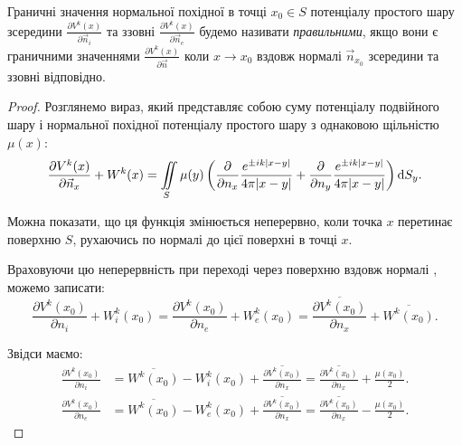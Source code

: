 \begin{definition}
	Граничні значення нормальної похідної в точці $x_0 \in S$ потенціалу простого шару зсередини $\frac{\partial V^k(x)}{\partial \vec n_{i}}$ та ззовні $\frac{\partial V^k(x)}{\partial \vec n_{e}}$ будемо називати \textit{правильними}, якщо вони є граничними значеннями $\frac{\partial V^k(x)}{\partial \vec n}$ коли $x \to x_0$ вздовж нормалі $\vec n_{x_0}$ зсередини та ззовні відповідно.
\end{definition}

\begin{proof}
	Розглянемо вираз, який представляє собою суму потенціалу подвійного шару і нормальної похідної потенціалу простого шару з  однаковою щільністю $\mu(x)$:
	\begin{equation}
		\frac{\partial V^k(x)}{\partial \vec n_x} + W^k(x) = \displaystyle\iint\limits_S \mu(y) \left( \frac{\partial}{\partial n_x} \frac{e^{\pm i k |x - y|}}{4 \pi |x - y|} + \frac{\partial}{\partial n_y} \frac{e^{\pm i k |x - y|}}{4 \pi |x - y|} \right) \mathop{}\!\mathrm{d} S_y.
	\end{equation}

	Можна показати, що ця функція змінюється неперервно, коли точка $x$ перетинає поверхню $S$, рухаючись по нормалі до цієї поверхні в точці $x$. \medskip

	Враховуючи цю неперервність при переході через поверхню вздовж нормалі , можемо записати:
	\begin{equation}
		\frac{\partial V^k(x_0)}{\partial n_{i}} + W_{i}^k(x_0) = \frac{\partial V^k(x_0)}{\partial n_{e}} + W_{e}^k(x_0) = \overline{\frac{\partial V^k(x_0)}{\partial n_x}} + \overline{W^k(x_0)}.
	\end{equation}

	Звідси маємо:
	\begin{align}
		\frac{\partial V^k(x_0)}{\partial n_{i}} &= \overline{W^k(x_0)} - W_{i}^k(x_0) + \overline{\frac{\partial V^k(x_0)}{\partial n_x}} = \overline{\frac{\partial V^k(x_0)}{\partial n_x}} + \frac{\mu(x_0)}{2}. \\
		\frac{\partial V^k(x_0)}{\partial n_{e}} &= \overline{W^k(x_0)} - W_{e}^k(x_0) + \overline{\frac{\partial V^k(x_0)}{\partial n_x}} = \overline{\frac{\partial V^k(x_0)}{\partial n_x}} - \frac{\mu(x_0)}{2}.
	\end{align}
\end{proof}
